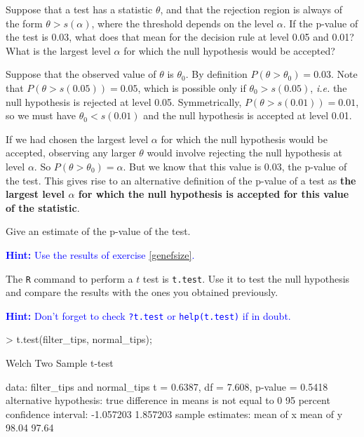 \documentclass[a4paper]{article}
\theoremstyle{definition}
\begin{document}
\begin{Exercise}
Suppose that a test has a statistic $\theta$, and that the rejection
region is always of the form $\theta > s(\alpha)$, where the threshold
depends on the level $\alpha$.
If the p-value of the test is 0.03, what does that mean for the decision
rule at level 0.05 and 0.01? What is the largest 
level $\alpha$ for which the null hypothesis would be accepted?
\end{Exercise}
\begin{Answer}
Suppose that the observed value of $\theta$ is $\theta_0$. By definition
$P(\theta > \theta_0) = 0.03$. Note that $P(\theta > s(0.05)) = 0.05$,
which is possible only if $\theta_0 > s(0.05)$, \textit{i.e.} the null
hypothesis is rejected at level 0.05. Symmetrically,
$P(\theta > s(0.01)) = 0.01$, so we must have $\theta_0 < s(0.01)$ and the
null hypothesis is accepted at level 0.01.

If we had chosen the largest level $\alpha$ for which the null hypothesis
would be accepted, observing any larger $\theta$ would involve rejecting
the null hypothesis at level $\alpha$. So $P(\theta > \theta_0) = \alpha$.
But we know that this value is 0.03, the p-value of the test. This gives
rise to an alternative definition of the p-value of a test as \textbf{the
largest level $\alpha$ for which the null hypothesis is accepted
for this value of the statistic}.
\end{Answer}

\begin{Exercise}
Give an estimate of the p-value of the test.
\par\noindent\textcolor{Blue}{\textbf{Hint:} Use the results of
exercise \ref{genefsize}.}
\end{Exercise}

\begin{Exercise}
The \texttt{R} command to perform a $t$ test is \texttt{t.test}.
Use it to test the null hypothesis and compare the results with
the ones you obtained previously.
\par\noindent\textcolor{Blue}{\textbf{Hint:} Don't forget to check
\texttt{?t.test} or \texttt{help(t.test)} if in doubt.}
\end{Exercise}
\begin{Answer}
\begin{Schunk}
\begin{Sinput}
> t.test(filter_tips, normal_tips);
\end{Sinput}
\begin{Soutput}
	Welch Two Sample t-test

data:  filter_tips and normal_tips 
t = 0.6387, df = 7.608, p-value = 0.5418
alternative hypothesis: true difference in means is not equal to 0 
95 percent confidence interval:
 -1.057203  1.857203 
sample estimates:
mean of x mean of y 
    98.04     97.64 
\end{Soutput}
\end{Schunk}
\end{Answer}
\end{document}
